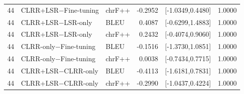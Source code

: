 \begin{table}[!ht]
{\begin{tabular}{rllrrr}
44 & CLRR+LSR$-$Fine-tuning & chrF++ & -0.2952 & [-1.0349,0.4480] & 1.0000 \\
44 & CLRR+LSR$-$LSR-only & BLEU & 0.4087 & [-0.6299,1.4883] & 1.0000 \\
44 & CLRR+LSR$-$LSR-only & chrF++ & 0.2432 & [-0.4074,0.9060] & 1.0000 \\
44 & CLRR-only$-$Fine-tuning & BLEU & -0.1516 & [-1.3730,1.0851] & 1.0000 \\
44 & CLRR-only$-$Fine-tuning & chrF++ & 0.0038 & [-0.7434,0.7715] & 1.0000 \\
44 & CLRR+LSR$-$CLRR-only & BLEU & -0.4113 & [-1.6181,0.7831] & 1.0000 \\
44 & CLRR+LSR$-$CLRR-only & chrF++ & -0.2990 & [-1.0437,0.4224] & 1.0000 \\
\bottomrule
\end{tabular}%
}
\end{table}
